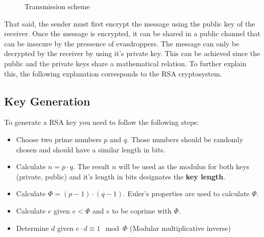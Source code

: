 \documentclass[usenames,dvipsnames,12pt]{report}
\begin{document}
\begin{figure}[H]
    \centering

    \caption{Transmission scheme}
    \label{fig:scheme}
\end{figure}

That said, the sender must first encrypt the message using the public key of the receiver.
Once the message is encrypted, it can be shared in a public channel that can be insecure by the pressence of
evasdroppers. The message can only be decrypted by the receiver by using it's private key. This can be achieved since
the public and the private keys share a mathematical relation. To further explain this, the following explanation
corresponds to the RSA cryptosystem.

\subsection{Key Generation}

To generate a RSA key you need to follow the following steps:

\begin{itemize}
    \item Choose two prime numbers $p$ and $q$.
        Those numbers should be randomly chosen and should have a similar length in bits.
    \item Calculate $n = p \cdot q$. The result $n$ will be used as the modulus for both
        keys (private, public) and it's length in bits designates the \textbf{key length}.
    \item Calculate $\Phi = (p - 1) \cdot (q - 1)$. Euler's properties are used to calculate $\Phi$.
    \item Calculate $e$ given $e < \Phi$ and $e$ to be coprime with $\Phi$.
    \item Determine $d$ given $e \cdot d \equiv 1 \mod \Phi$ (Modular multiplicative inverse)
\end{itemize}
\end{document}
